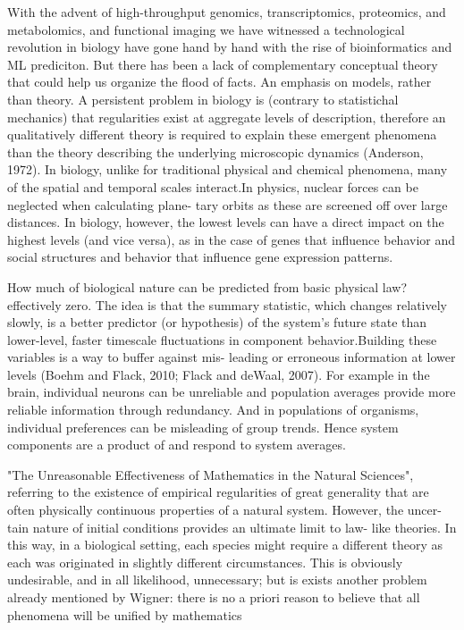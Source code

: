 \documentclass[onecollarge,runningheads]{svjour2}
\begin{document}
With the advent of high-throughput genomics, transcriptomics, proteomics, and metabolomics, and functional imaging we have witnessed a technological revolution in biology have gone hand by hand with the rise of bioinformatics and ML prediciton.
But there has been a lack of complementary conceptual theory that could help us organize the flood of facts. An emphasis on models, rather than theory.
A persistent problem in biology is (contrary to statistichal mechanics) that regularities exist at aggregate levels of description, therefore an qualitatively different theory is required to explain these emergent phenomena than the theory describing the underlying microscopic dynamics (Anderson, 1972).
In biology, unlike for traditional physical and chemical phenomena, many of the spatial and temporal scales interact.In physics, nuclear forces can be neglected when calculating plane- tary orbits as these are screened off over large distances. In biology, however, the lowest levels can have a direct impact on the highest levels (and vice versa), as in the case of genes that influence behavior and social structures and behavior that influence gene expression patterns.
 
How much of biological nature can be predicted from basic physical law? effectively zero.
The idea is that the summary statistic, which changes relatively slowly, is a better predictor (or hypothesis) of the system's future state than lower-level, faster timescale fluctuations in component behavior.Building these variables is a way to buffer against mis- leading or erroneous information at lower levels (Boehm and Flack, 2010; Flack and deWaal, 2007). For example in the brain, individual neurons can be unreliable and population averages provide more reliable information through redundancy. And in populations of organisms, individual preferences can be misleading of group trends. Hence system components are a product of and respond to system averages.

"The Unreasonable Effectiveness of Mathematics in the Natural Sciences", referring to the existence of empirical regularities of great generality that are often physically continuous properties of a natural system. However, the uncer- tain nature of initial conditions provides an ultimate limit to law- like theories. In this way, in a biological setting, each species might require a different theory as each was originated in slightly different circumstances. This is obviously undesirable, and in all likelihood, unnecessary; but is exists another problem already mentioned by  Wigner: there is no a priori reason to believe that all phenomena will be unified by mathematics
\end{document}
